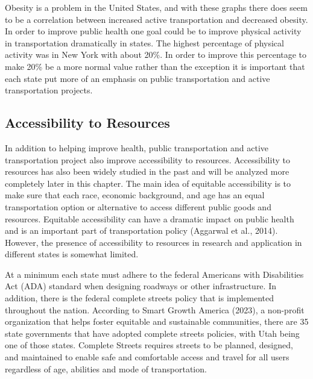 \documentclass[
  letterpaper,
  DIV=11,
  numbers=noendperiod]{scrreport}
\begin{document}
Obesity is a problem in the United States, and with these graphs there
does seem to be a correlation between increased active transportation
and decreased obesity. In order to improve public health one goal could
be to improve physical activity in transportation dramatically in
states. The highest percentage of physical activity was in New York with
about 20\%. In order to improve this percentage to make 20\% be a more
normal value rather than the exception it is important that each state
put more of an emphasis on public transportation and active
transportation projects.

\hypertarget{accessibility-to-resources}{%
\subsection{Accessibility to
Resources}\label{accessibility-to-resources}}

In addition to helping improve health, public transportation and active
transportation project also improve accessibility to resources.
Accessibility to resources has also been widely studied in the past and
will be analyzed more completely later in this chapter. The main idea of
equitable accessibility is to make sure that each race, economic
background, and age has an equal transportation option or alternative to
access different public goods and resources. Equitable accessibility can
have a dramatic impact on public health and is an important part of
transportation policy (Aggarwal et al., 2014). However, the presence of
accessibility to resources in research and application in different
states is somewhat limited.

At a minimum each state must adhere to the federal Americans with
Disabilities Act (ADA) standard when designing roadways or other
infrastructure. In addition, there is the federal complete streets
policy that is implemented throughout the nation. According to Smart
Growth America (2023), a non-profit organization that helps foster
equitable and sustainable communities, there are 35 state governments
that have adopted complete streets policies, with Utah being one of
those states. Complete Streets requires streets to be planned, designed,
and maintained to enable safe and comfortable access and travel for all
users regardless of age, abilities and mode of transportation.
\end{document}
